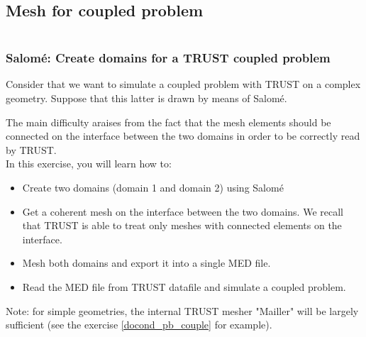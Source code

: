 \documentclass[10pt, hyperref={unicode=true,pdfusetitle, bookmarks=true,bookmarksnumbered=false,bookmarksopen=false, breaklinks=false,pdfborder={0 0l 1},backref=true,colorlinks=true,linkcolor=darkblue,pageanchor}]{beamer}
\begin{document}
\subsection{Mesh for coupled problem}
\begin{frame}
\begin{small}
\begin{columns}[c] 
\tableofcontents[sections={1-8},currentsection, currentsubsection]
\tableofcontents[sections={9-16},currentsection, currentsubsection]
\end{columns}
\end{small}
\end{frame}
\begin{frame}
\frametitle{Salom\'e: Create domains for a TRUST coupled problem\label{salomecoupledpb}}
\begin{block}{}
Consider that we want to simulate a coupled problem with TRUST on a complex geometry. Suppose that this latter is drawn by means of Salom\'e.

The main difficulty araises from the fact that the mesh elements should be connected on the interface between the two domains in order to be correctly read by TRUST. \\
%
In this exercise, you will learn how to:
\begin{itemize}
\item  Create two domains (domain 1 and domain 2) using Salom\'e
\item  Get a coherent mesh on the interface between the two domains. We recall that TRUST is able to treat only meshes with connected elements on the interface.
\item  Mesh both domains and export it into a single MED file.
\item  Read the MED file from TRUST datafile and simulate a coupled problem.
\end{itemize}
%
Note: for simple geometries, the internal TRUST mesher "Mailler" will be largely sufficient (see the exercise \ref{docond_pb_couple} for example).

\end{block}
\end{frame}
\end{document}
